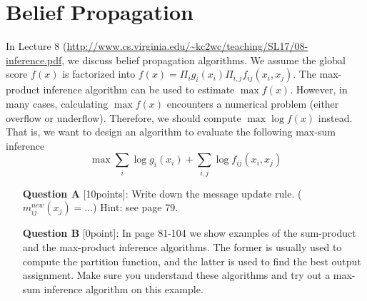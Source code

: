 \section{Belief Propagation} 
In Lecture 8 (\url{http://www.cs.virginia.edu/~kc2wc/teaching/SL17/08-inference.pdf}, we discuss belief propagation algorithms.  We assume the global score $f(x)$ is factorized into $f(x)=\Pi_{i}g_i(x_i)\Pi_{i,j}f_{ij}(x_i,x_j)$. The max-product inference algorithm can be used to estimate
$\max f(x)$. However, in many cases, calculating $\max f(x)$  encounters a numerical problem (either overflow or underflow). Therefore, we should compute $\max \log f(x)$ instead. That is, we want to design an algorithm to evaluate the following max-sum inference
$$\max \sum_{i}\log g_i(x_i) + \sum_{i,j} \log f_{ij}(x_i,x_j)$$
\begin{itemize}
\item[{\bf Question A}][10points]: Write down the message update rule. ($m_{ij}^{new}(x_j)= \ldots$) Hint: 
see page 79.

\item[{\bf Question B}] [0point]:
In page 81-104 we show examples of the sum-product and the max-product inference algorithms. The former is usually used to compute the partition function, and the latter is used to find the best output assignment. Make sure you understand these algorithms and try out a max-sum inference algorithm on this example.
\end{itemize}


